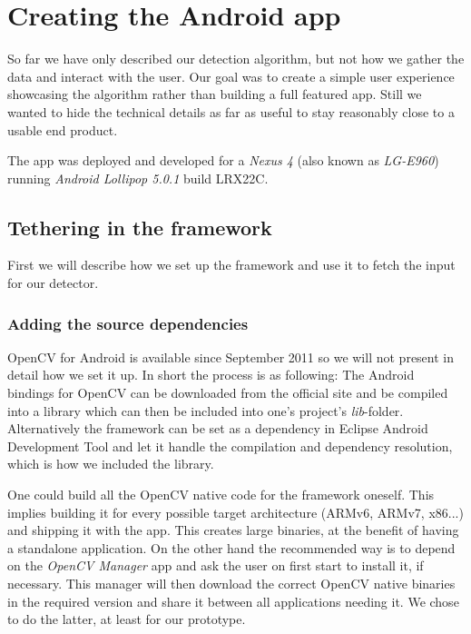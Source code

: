 
\chapter{Creating the Android app}
\label{android}
	So far we have only described our detection algorithm, but not how we gather the data and interact with the user. Our goal was to create a simple user experience showcasing the algorithm rather than building a full featured app. Still we wanted to hide the technical details as far as useful to stay reasonably close to a usable end product.

	The app was deployed and developed for a \textit{Nexus 4} (also known as \textit{LG-E960}) running \textit{Android Lollipop 5.0.1} build LRX22C.

	\section{Tethering in the framework}
	\label{android-framework}
	First we will describe how we set up the framework and use it to fetch the input for our detector.

	\subsection{Adding the source dependencies}
	\label{android-framework-dependencies}
	OpenCV for Android is available since September 2011 so we will not present in detail how we set it up. In short the process is as following: The Android bindings for OpenCV can be downloaded from the official site and be compiled into a library which can then be included into one's project's \textit{lib}-folder. Alternatively the framework can be set as a dependency in Eclipse Android Development Tool and let it handle the compilation and dependency resolution, which is how we included the library.

	One could build all the OpenCV native code for the framework oneself. This implies building it for every possible target architecture (ARMv6, ARMv7, x86...) and shipping it with the app. This creates large binaries, at the benefit of having a standalone application. On the other hand the recommended way is to depend on the \textit{OpenCV Manager} app and ask the user on first start to install it, if necessary. This manager will then download the correct OpenCV native binaries in the required version and share it between all applications needing it. We chose to do the latter, at least for our prototype.

